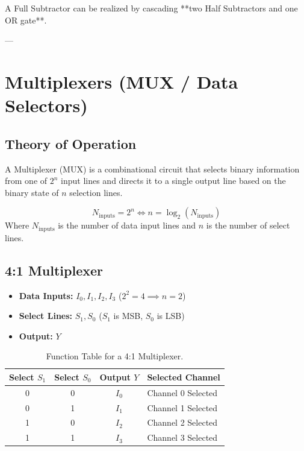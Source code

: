 \noindent A Full Subtractor can be realized by cascading **two Half Subtractors and one OR gate**.

---

\section{Multiplexers (MUX / Data Selectors)}

\subsection{Theory of Operation}
A Multiplexer (MUX) is a combinational circuit that selects binary information from one of $2^n$ input lines and directs it to a single output line based on the binary state of $n$ selection lines.

\begin{keyequation}
\begin{equation}
    N_{\text{inputs}} = 2^n \iff n = \log_2(N_{\text{inputs}})
\end{equation}
Where $N_{\text{inputs}}$ is the number of data input lines and $n$ is the number of select lines.
\end{keyequation}

\subsection{4:1 Multiplexer}
\begin{itemize}
    \item \textbf{Data Inputs:} $I_0, I_1, I_2, I_3$ ($2^2 = 4 \implies n=2$)
    \item \textbf{Select Lines:} $S_1, S_0$ ($S_1$ is MSB, $S_0$ is LSB)
    \item \textbf{Output:} $Y$
\end{itemize}

\begin{table}[htbp]
\centering
\small
\begin{tabular}{cc|c|l}
\toprule
\textbf{Select $S_1$} & \textbf{Select $S_0$} & \textbf{Output $Y$} & \textbf{Selected Channel} \\
\midrule
0 & 0 & $I_0$ & Channel 0 Selected \\
0 & 1 & $I_1$ & Channel 1 Selected \\
1 & 0 & $I_2$ & Channel 2 Selected \\
1 & 1 & $I_3$ & Channel 3 Selected \\
\bottomrule
\end{tabular}
\caption{Function Table for a 4:1 Multiplexer.}
\label{tab:4-to-1-mux}
\end{table}

